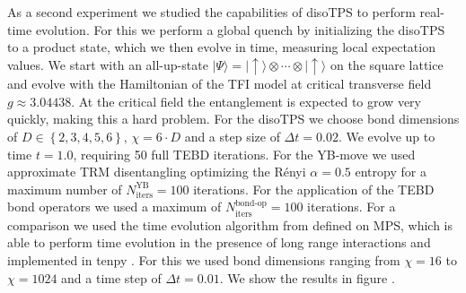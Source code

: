 As a second experiment we studied the capabilities of disoTPS to perform real-time evolution. For this we perform a global quench by initializing the disoTPS to a product state, which we then evolve in time, measuring local expectation values. We start with an all-up-state $|\Psi\rangle = |\uparrow\rangle\otimes\cdots\otimes|\uparrow\rangle$ on the square lattice and evolve with the Hamiltonian of the TFI model at critical transverse field $g \approx 3.04438$. At the critical field the entanglement is expected to grow very quickly, making this a hard problem. For the disoTPS we choose bond dimensions of $D\in\left\{2, 3, 4, 5, 6\right\}$, $\chi = 6\cdot D$ and a step size of $\Delta t = 0.02$. We evolve up to time $t = 1.0$, requiring 50 full TEBD iterations. For the YB-move we used approximate TRM disentangling optimizing the Rényi $\alpha = 0.5$ entropy for a maximum number of $N_\text{iters}^\text{YB} = 100$ iterations. For the application of the TEBD bond operators we used a maximum of $N_\text{iters}^\text{bond-op} = 100$ iterations. For a comparison we used the time evolution algorithm from \cite{cite:time_evolving_a_mps_with_long_range_interactions} defined on MPS, which is able to perform time evolution in the presence of long range interactions and implemented in tenpy \cite{cite:tenpy}. For this we used bond dimensions ranging from $\chi = 16$ to $\chi= 1024$ and a time step of $\Delta t = 0.01$. We show the results in figure \figref{}.